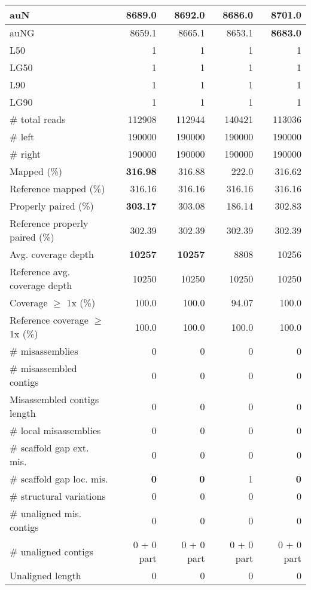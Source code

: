 \documentclass[12pt,a4paper]{article}
\begin{document}
\begin{table}[ht]
\begin{center}
\begin{tabular}{|l*{4}{|r}|}
auN & 8689.0 & 8692.0 & 8686.0 & {\bf 8701.0} \\ \hline
auNG & 8659.1 & 8665.1 & 8653.1 & {\bf 8683.0} \\ \hline
L50 & 1 & 1 & 1 & 1 \\ \hline
LG50 & 1 & 1 & 1 & 1 \\ \hline
L90 & 1 & 1 & 1 & 1 \\ \hline
LG90 & 1 & 1 & 1 & 1 \\ \hline
\# total reads & 112908 & 112944 & 140421 & 113036 \\ \hline
\# left & 190000 & 190000 & 190000 & 190000 \\ \hline
\# right & 190000 & 190000 & 190000 & 190000 \\ \hline
Mapped (\%) & {\bf 316.98} & 316.88 & 222.0 & 316.62 \\ \hline
Reference mapped (\%) & 316.16 & 316.16 & 316.16 & 316.16 \\ \hline
Properly paired (\%) & {\bf 303.17} & 303.08 & 186.14 & 302.83 \\ \hline
Reference properly paired (\%) & 302.39 & 302.39 & 302.39 & 302.39 \\ \hline
Avg. coverage depth & {\bf 10257} & {\bf 10257} & 8808 & 10256 \\ \hline
Reference avg. coverage depth & 10250 & 10250 & 10250 & 10250 \\ \hline
Coverage $\geq$ 1x (\%) & 100.0 & 100.0 & 94.07 & 100.0 \\ \hline
Reference coverage $\geq$ 1x (\%) & 100.0 & 100.0 & 100.0 & 100.0 \\ \hline
\# misassemblies & 0 & 0 & 0 & 0 \\ \hline
\# misassembled contigs & 0 & 0 & 0 & 0 \\ \hline
Misassembled contigs length & 0 & 0 & 0 & 0 \\ \hline
\# local misassemblies & 0 & 0 & 0 & 0 \\ \hline
\# scaffold gap ext. mis. & 0 & 0 & 0 & 0 \\ \hline
\# scaffold gap loc. mis. & {\bf 0} & {\bf 0} & 1 & {\bf 0} \\ \hline
\# structural variations & 0 & 0 & 0 & 0 \\ \hline
\# unaligned mis. contigs & 0 & 0 & 0 & 0 \\ \hline
\# unaligned contigs & 0 + 0 part & 0 + 0 part & 0 + 0 part & 0 + 0 part \\ \hline
Unaligned length & 0 & 0 & 0 & 0 \\ \hline

\end{tabular}
\end{center}
\end{table}
\end{document}
